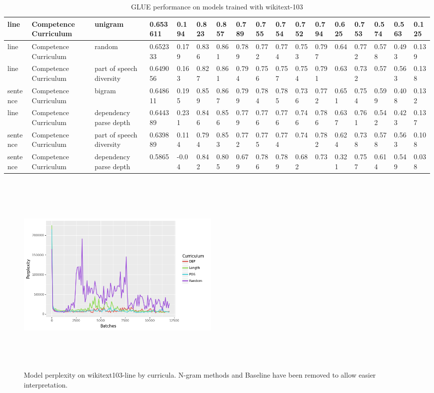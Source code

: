\begin{table}[]
{\begin{tabular}{|l|l|l|l|l|l|l|l|l|l|l|l|l|l|l|l|l|}
line & Competence Curriculum & unigram & 0.653611 & 0.194 & 0.823 & 0.857 & 0.789 & 0.755 & 0.754 & 0.752 & 0.794 & 0.625 & 0.753 & 0.574 & 0.563 & 0.125 \\ \hline
line & Competence Curriculum & random & 0.652333 & 0.179 & 0.836 & 0.861 & 0.789 & 0.772 & 0.774 & 0.753 & 0.797 & 0.64 & 0.772 & 0.578 & 0.493 & 0.139 \\ \hline
line & Competence Curriculum & part of speech diversity & 0.649056 & 0.163 & 0.827 & 0.861 & 0.794 & 0.756 & 0.757 & 0.754 & 0.791 & 0.63 & 0.732 & 0.57 & 0.563 & 0.138 \\ \hline
sentence & Competence Curriculum & bigram & 0.648611 & 0.195 & 0.859 & 0.867 & 0.799 & 0.784 & 0.785 & 0.736 & 0.772 & 0.651 & 0.754 & 0.599 & 0.408 & 0.132 \\ \hline
line & Competence Curriculum & dependency parse depth & 0.644389 & 0.231 & 0.846 & 0.856 & 0.779 & 0.776 & 0.776 & 0.746 & 0.786 & 0.637 & 0.761 & 0.542 & 0.423 & 0.137 \\ \hline
sentence & Competence Curriculum & part of speech diversity & 0.639889 & 0.114 & 0.794 & 0.853 & 0.772 & 0.775 & 0.774 & 0.74 & 0.782 & 0.624 & 0.738 & 0.578 & 0.563 & 0.108 \\ \hline
sentence & Competence Curriculum & dependency parse depth & 0.5865 & -0.04 & 0.842 & 0.805 & 0.679 & 0.786 & 0.789 & 0.682 & 0.73 & 0.321 & 0.757 & 0.614 & 0.549 & 0.038 \\ \hline
\end{tabular}
}
\caption{GLUE performance on models trained with wikitext-103}
\label{tab:glue-wiki-103}
\end{table}
\begin{figure}[h]
\centering
\label{fig:wikitext-103-line}
\includegraphics[width=10cm, height=10cm]{Thesis/images/wikitext-103lineminusbigrambaselinetrigramunigram.png}
\caption{Model perplexity on wikitext103-line by curricula. N-gram methods and Baseline have been removed to allow easier interpretation.}
\end{figure}

